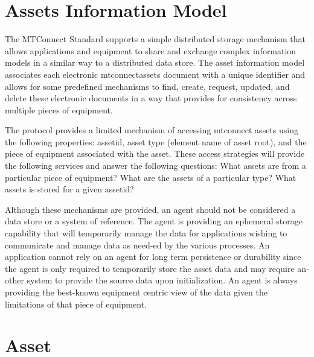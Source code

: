 
\section{Assets Information Model}
\label{sec:Assets Information Model}
The MTConnect Standard supports a simple distributed storage mechanism that allows applications and equipment to share and exchange complex information models in a similar way to a distributed data store.  The \gls{asset information model} associates each electronic \gls{mtconnectassets} document with a unique identifier and allows for some predefined mechanisms to find, create, request, updated, and delete these electronic documents in a way that provides for consistency across multiple pieces of equipment.

The protocol provides a limited mechanism of accessing \glspl{mtconnect asset} using the following properties: \gls{assetid}, \gls{asset} type (element name of \gls{asset} root), and the piece of equipment associated with the \gls{asset}.  These access strategies will provide the following services and answer the following questions: What \glspl{asset} are from a particular piece of equipment?  What are the \glspl{asset} of a particular type? What \glspl{asset} is stored for a given \gls{assetid}?

Although these mechanisms are provided, an \gls{agent} should not be considered a data store or a system of reference.  The \gls{agent} is providing an ephemeral storage capability that will temporarily manage the data for applications wishing to communicate and manage data as need-ed by the various processes.  An application cannot rely on an \gls{agent} for long term persistence or durability since the \gls{agent} is only required to temporarily store the \gls{asset} data and may require an-other system to provide the source data upon initialization.  An \gls{agent} is always providing the best-known equipment centric view of the data given the limitations of that piece of equipment.

\section{Asset}
\label{sec:Asset}





